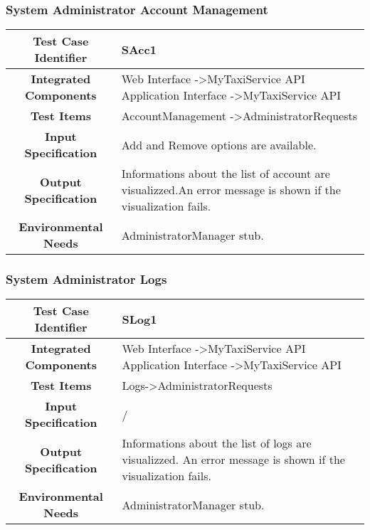\documentclass[11pt, a4paper,titlepage]{article}
\begin{document}
	\subsubsection{System Administrator Account Management}
	\begin{tabularx}{\textwidth}{| c|X|}
		\hline \textbf{Test Case Identifier} & SAcc1 \\
		\hline \textbf{Integrated Components} & Web Interface -\textgreater MyTaxiService API \newline 
		Application Interface -\textgreater MyTaxiService API \\
		\hline \textbf{Test Items} & AccountManagement -\textgreater AdministratorRequests \\
		\hline \textbf{Input Specification} & Add and Remove options are available. \\
		\hline \textbf{Output Specification} & Informations about the list of account are visualizzed.\newline An error message is shown if the visualization fails. \\
		\hline \textbf{Environmental Needs} & AdministratorManager stub. \\
		\hline
	\end{tabularx}
	\newline
	\newline
	\subsubsection{System Administrator Logs}
	\begin{tabularx}{\textwidth}{| c|X|}
		\hline \textbf{Test Case Identifier} & SLog1 \\
		\hline \textbf{Integrated Components} & Web Interface -\textgreater MyTaxiService API \newline 
		Application Interface -\textgreater MyTaxiService API \\
		\hline \textbf{Test Items} & Logs-\textgreater AdministratorRequests  \\
		\hline \textbf{Input Specification} & / \\
		\hline \textbf{Output Specification} & Informations about the list of logs are visualizzed.\newline
		An error message is shown if the visualization fails. \\
		\hline \textbf{Environmental Needs} & AdministratorManager stub. \\
		\hline
	\end{tabularx}
	\newline
	\newline
\end{document}
